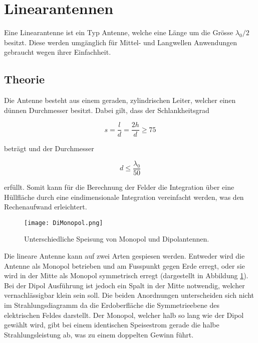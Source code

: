 \section{Linearantennen}

Eine Linearantenne ist ein Typ Antenne, welche eine Länge um die Grösse $\lambda_0/2$ besitzt. Diese werden umgänglich für Mittel- und Langwellen Anwendungen gebraucht wegen ihrer Einfachheit. 

\subsection{Theorie}\label{sec:LinTheo}

Die Antenne besteht aus einem geraden, zylindrischen Leiter, welcher einen dünnen Durchmesser besitzt. Dabei gilt, dass der Schlankheitsgrad

\begin{equation}
s = \frac{l}{d}=\frac{2h}{d} \geq 75
\end{equation} 

beträgt und der Durchmesser

\begin{equation}
d \leq \frac{\lambda_0}{50}
\end{equation}

erfüllt. Somit kann für die Berechnung der Felder die Integration über eine Hüllfläche durch eine eindimensionale Integration vereinfacht werden, was den Rechenaufwand erleichtert.

\begin{figure}[!ht]
	\centering
    \texttt{[image: DiMonopol.png]}
    \caption{Unterschiedliche Speisung von Monopol und Dipolantennen.}
    \label{fig:DiMonopol}
\end{figure}

Die lineare Antenne kann auf zwei Arten gespiesen werden. Entweder wird die Antenne als Monopol betrieben und am Fusspunkt gegen Erde erregt, oder sie wird in der Mitte als Monopol symmetrisch erregt (dargestellt in Abbildung \ref{fig:DiMonopol}). Bei der Dipol Ausführung ist jedoch ein Spalt in der Mitte notwendig, welcher vernachlässigbar klein sein soll. Die beiden Anordnungen unterscheiden sich nicht im Strahlungsdiagramm da die Erdoberfläche die Symmetrieebene des elektrischen Feldes darstellt. Der Monopol, welcher halb so lang wie der Dipol gewählt wird, gibt bei einem identischen Speisestrom gerade die halbe Strahlungsleistung ab, was zu einem doppelten Gewinn führt.\\

